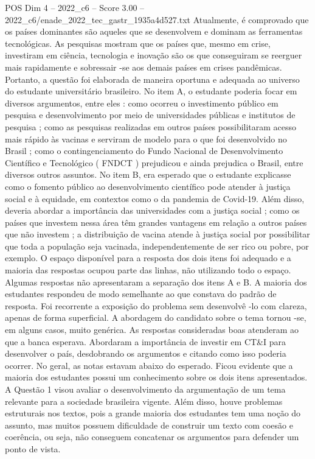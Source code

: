 \begin{textsample}{POS Dim 4 – 2022\_c6 – Score 3.00 – 2022\_c6/enade\_2022\_tec\_gastr\_1935a4d527.txt}
Atualmente, é comprovado que os países dominantes são aqueles que se desenvolvem e dominam as ferramentas tecnológicas.
As pesquisas mostram que os países que, mesmo em crise, investiram em ciência, tecnologia e inovação são os que conseguiram se reerguer mais rapidamente e sobressair -se aos demais países em crises pandêmicas.
Portanto, a questão foi elaborada de maneira oportuna e adequada ao universo do estudante universitário brasileiro.
No item A, o estudante poderia focar em diversos argumentos, entre eles : como ocorreu o investimento público em pesquisa e desenvolvimento por meio de universidades públicas e institutos de pesquisa ; como as pesquisas realizadas em outros países possibilitaram acesso mais rápido às vacinas e serviram de modelo para o que foi desenvolvido no Brasil ; como o contingenciamento do Fundo Nacional de Desenvolvimento Científico e Tecnológico ( FNDCT ) prejudicou e ainda prejudica o Brasil, entre diversos outros assuntos.
No item B, era esperado que o estudante explicasse como o fomento público ao desenvolvimento científico pode atender à justiça social e à equidade, em contextos como o da pandemia de Covid-19.
Além disso, deveria abordar a importância das universidades com a justiça social ; como os países que investem nessa área têm grandes vantagens em relação a outros países que não investem ; a distribuição de vacina atende à justiça social por possibilitar que toda a população seja vacinada, independentemente de ser rico ou pobre, por exemplo.
O espaço disponível para a resposta dos dois itens foi adequado e a maioria das respostas ocupou parte das linhas, não utilizando todo o espaço.
Algumas respostas não apresentaram a separação dos itens A e B.
A maioria dos estudantes respondeu de modo semelhante ao que constava do padrão de resposta.
Foi recorrente a exposição do problema sem desenvolvê -lo com clareza, apenas de forma superficial.
A abordagem do candidato sobre o tema tornou -se, em alguns casos, muito genérica.
As respostas consideradas boas atenderam ao que a banca esperava.
Abordaram a importância de investir em CT\&I para desenvolver o país, desdobrando os argumentos e citando como isso poderia ocorrer.
No geral, as notas estavam abaixo do esperado.
Ficou evidente que a maioria dos estudantes possui um conhecimento sobre os dois itens apresentados.
A Questão 1 visou avaliar o desenvolvimento da argumentação de um tema relevante para a sociedade brasileira vigente.
Além disso, houve problemas estruturais nos textos, pois a grande maioria dos estudantes tem uma noção do assunto, mas muitos possuem dificuldade de construir um texto com coesão e coerência, ou seja, não conseguem concatenar os argumentos para defender um ponto de vista.

\end{textsample}
